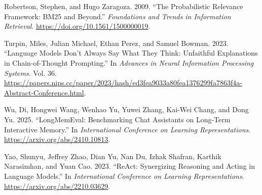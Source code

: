 \documentclass[
  11pt,
]{article}
\newlength{\cslhangindent}
\newenvironment{CSLReferences}[2] %
 {\begin{list}{}{%
  \setlength{\itemindent}{0pt}
  \setlength{\leftmargin}{0pt}
  \setlength{\parsep}{0pt}
  \ifodd #1
   \setlength{\leftmargin}{\cslhangindent}
   \setlength{\itemindent}{-1\cslhangindent}
  \fi
  \setlength{\itemsep}{#2\baselineskip}}}
 {\end{list}}
\begin{document}
\begin{CSLReferences}{1}{0}
Robertson, Stephen, and Hugo Zaragoza. 2009. {``The Probabilistic
Relevance Framework: BM25 and Beyond.''} \emph{Foundations and Trends in
Information Retrieval}. \url{https://doi.org/10.1561/1500000019}.

Turpin, Miles, Julian Michael, Ethan Perez, and Samuel Bowman. 2023.
{``Language Models Don't Always Say What They Think: Unfaithful
Explanations in Chain-of-Thought Prompting.''} In \emph{Advances in
Neural Information Processing Systems}. Vol. 36.
\url{https://papers.nips.cc/paper/2023/hash/ed3fea9033a80fea1376299fa7863f4a-Abstract-Conference.html}.

Wu, Di, Hongwei Wang, Wenhao Yu, Yuwei Zhang, Kai-Wei Chang, and Dong
Yu. 2025. {``LongMemEval: Benchmarking Chat Assistants on Long-Term
Interactive Memory.''} In \emph{International Conference on Learning
Representations}. \url{https://arxiv.org/abs/2410.10813}.

Yao, Shunyu, Jeffrey Zhao, Dian Yu, Nan Du, Izhak Shafran, Karthik
Narasimhan, and Yuan Cao. 2023. {``ReAct: Synergizing Reasoning and
Acting in Language Models.''} In \emph{International Conference on
Learning Representations}. \url{https://arxiv.org/abs/2210.03629}.

\end{CSLReferences}
\end{document}
